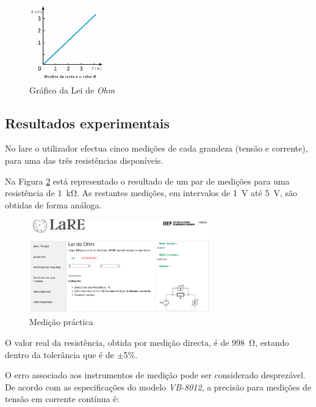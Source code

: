 \begin{figure}[hbtp]
	\centering
	\includegraphics[width=0.3\textwidth]{figures/grafico_Ohm.png}
	\caption{Gráfico da Lei de \textit{Ohm}}
	\label{fig:graphohmrepetido}
\end{figure}

\subsection{Resultados experimentais}
\label{sec:resultados_praticosOHM}
No \acrshort{lare} o utilizador efectua cinco medições de cada grandeza (tensão e corrente), para uma das três resistências disponíveis.

Na Figura \ref{fig:resultados_medicoes_1k} está representado o resultado de um par de medições para uma resistência de \SI{1}{\kilo\ohm}. As restantes medições, em intervalos de \SI{1}{\volt} até \SI{5}{\volt}, são obtidas de forma análoga.

\begin{figure}[hbtp]
	\centering
	\includegraphics[width=0.7\textwidth]{figures/resultados_medicoes_ohm.png}
	\caption{Medição práctica}
	\label{fig:resultados_medicoes_1k}
\end{figure}

O valor real da resistência, obtida por medição directa, é de \SI{998}{\ohm}, estando dentro da tolerância que é de $\pm$5\%.

O erro associado aos instrumentos de medição pode ser considerado desprezável. De acordo com as especificações do modelo \textit{VB-8012}\cite{datasheetvb8012}, a precisão para medições de tensão em corrente contínua é:

